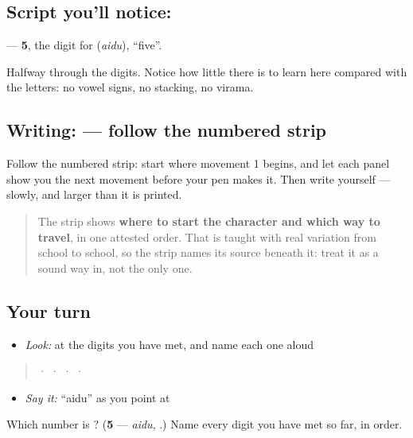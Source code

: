 \subsection*{Script you'll notice: }
\textbf{} — \textbf{5}, the digit for \textbf{} (\emph{aidu}), \textquotedblleft{}five\textquotedblright{}.

Halfway through the digits. Notice how little there is to learn here compared with the letters: no vowel signs, no stacking, no virama.

\subsection*{Writing:  — follow the numbered strip}

Follow the numbered strip: start where movement 1 begins, and let each panel show you the next movement before your pen makes it. Then write  yourself — slowly, and larger than it is printed.

\begin{quote}
The strip shows \textbf{where to start the character and which way to travel}, in one attested order. That is taught with real variation from school to school, so the strip names its source beneath it: treat it as a sound way in, not the only one.
\end{quote}

\subsection*{Your turn}
\begin{itemize}
\raggedright
  \item \emph{Look:} at the digits you have met, and name each one aloud
\end{itemize}

\begin{quote}
  ·    ·    ·    ·  
\end{quote}

\begin{itemize}
\raggedright
  \item \emph{Say it:} \textquotedblleft{}aidu\textquotedblright{} as you point at 
\end{itemize}

\begin{tcolorbox}[breakable,colback=teal!4,colframe=teal!35!black,title={Before you move on}]
Which number is \textbf{}? (\textbf{5} — \emph{aidu}, .) Name every digit you have met so far, in order.
\end{tcolorbox}
